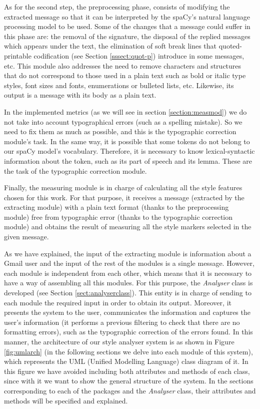 As for the second step, the preprocessing phase, consists of modifying the extracted message so that it can be interpreted by the spaCy's natural language processing model to be used. Some of the changes that a message could suffer in this phase are: the removal of the signature, the disposal of the replied messages which appears under the text, the elimination of soft break lines that quoted-printable codification (see Section \ref{sssect:quot-p}) introduce in some messages, etc. This module also addresses the need to remove characters and structures that do not correspond to those used in a plain text such as bold or italic type styles, font sizes and fonts, enumerations or bulleted lists, etc. Likewise, its output is a message with its body as a plain text.

In the implemented metrics (as we will see in section \ref{section:measmod}) we do not take into account typographical errors (such as a spelling mistake). So we need to fix them as much as possible, and this is the typographic correction module's task. In the same way, it is possible that some tokens do not belong to our spaCy model's vocabulary. Therefore, it is necessary to know lexical-syntactic information about the token, such as its part of speech and its lemma. These are the task of the typographic correction module.

Finally, the measuring module is in charge of calculating all the style features chosen for this work. For that purpose, it receives a message (extracted by the extracting module) with a plain text format (thanks to the preprocessing module) free from typographic error (thanks to the typographic correction module) and obtains the result of measuring all the style markers selected in the given message.

As we have explained, the input of the extracting module is information about a Gmail user and the input of the rest of the modules is a single message. However, each module is independent from each other, which means that it is necessary to have a way of assembling all this modules. For this purpose, the \textit{Analyser} class is developed (see Section \ref{sect:analyserclass}). This entity is in charge of sending to each module the required input in order to obtain its output. Moreover, it presents the system to the user, communicates the information and captures the user's information (it performs a previous filtering to check that there are no formatting errors), such as the typographic correction of the errors found. In this manner, the architecture of our style analyser system is as shown in Figure \ref{fig:umlarch} (in the following sections we delve into each module of this system), which represents the UML (Unified Modelling Language) class diagram of it. In this figure we have avoided including both attributes and methods of each class, since with it we want to show the general structure of the system. In the sections corresponding to each of the packages and the \textit{Analyser} class, their attributes and methods will be specified and explained.

